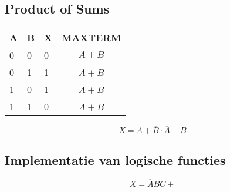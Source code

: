 \documentclass[11pt, a4paper]{article}
\begin{document}
\subsection{Product of Sums}

\begin{tabular}{l l l || c}
A & B & X & MAXTERM \\
\hline
0 & 0 & 0 & $A+B$ \\
0 & 1 & 1 & $A+\overline{B}$ \\
1 & 0 & 1 & $\overline{A}+B $\\
1 & 1 & 0 & $\overline{A}+\overline{B}$ \\
\end{tabular}

$$X = A+\overline{B} \cdot \overline{A}+B $$



\subsection{Implementatie van logische functies}

$$ X = \overline{A}BC + $$

\newpage
\end{document}

